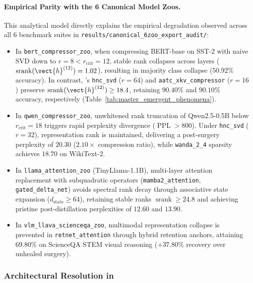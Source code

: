 \paragraph{Empirical Parity with the 6 Canonical Model Zoos.}
This analytical model directly explains the empirical degradation observed across all 6 benchmark suites in \texttt{results/canonical\_6zoo\_export\_audit/}:
\begin{itemize}
    \item In \texttt{bert\_compressor\_zoo}, when compressing BERT-base on SST-2 with naive SVD down to $r=8 < r_{\text{crit}} = 12$, stable rank collapses across layers ($\operatorname{srank}(\vect{h}^{(12)}) = 1.02$), resulting in majority class collapse ($50.92\%$ accuracy). In contrast, \neuralops's \texttt{hnc\_svd} ($r=64$) and \texttt{aatc\_xkv\_compressor} ($r=16$) preserve $\operatorname{srank}(\vect{h}^{(12)}) \ge 18.4$, retaining $90.40\%$ and $90.10\%$ accuracy, respectively (Table~\ref{tab:master_emergent_phenomena}).
    \item In \texttt{qwen\_compressor\_zoo}, unwhitened rank truncation of Qwen2.5-0.5B below $r_{\text{crit}} = 18$ triggers rapid perplexity divergence ($\operatorname{PPL} > 800$). Under \texttt{hnc\_svd} ($r=32$), representation rank is maintained, delivering a post-surgery perplexity of $20.30$ ($2.10\times$ compression ratio), while \texttt{wanda\_2\_4} sparsity achieves $18.70$ on WikiText-2.
    \item In \texttt{llama\_attention\_zoo} (TinyLlama-1.1B), multi-layer attention replacement with subquadratic operators (\texttt{mamba2\_attention}, \texttt{gated\_delta\_net}) avoids spectral rank decay through associative state expansion ($d_{\text{state}} \ge 64$), retaining stable ranks $\operatorname{srank} \ge 24.8$ and achieving pristine post-distillation perplexities of $12.60$ and $13.90$.
    \item In \texttt{vlm\_llava\_scienceqa\_zoo}, multimodal representation collapse is prevented in \texttt{retnet\_attention} through hybrid retention anchors, attaining $69.80\%$ on ScienceQA STEM visual reasoning ($+37.80\%$ recovery over unhealed surgery).
\end{itemize}

\subsubsection{Architectural Resolution in \neuralops}
\label{sec:phenom_rank_resolution}

